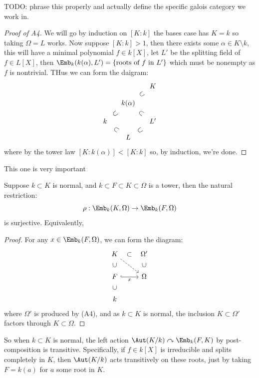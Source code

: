 \documentclass{article}
\begin{document}
TODO: phrase this properly and actually define the specific galois category we work in.

\begin{proof}[Proof of A4]
    We will go by induction on $[K:k]$ the bases case has $K=k$ so taking $\Omega = L$ works. Now suppose $[K:k]>1$, then there exists some $\alpha\in K\setminus k$, this will have a minimal polynomial $f\in k[X]$, let $L'$ be the splitting field of $f\in L[X]$, then $\Emb_k(k(\alpha),L') = \{\text{roots of $f$ in $L'$}\}$ which must be nonempty as $f$ is nontrivial. THus we can form the daigram:\[
    \begin{tikzcd}[row sep = small, column sep = small]
        & & K \\
        & k(\alpha) \arrow[ur, phantom, sloped, "\subset"] \arrow[dr, phantom, sloped, "\subset"]\\
        k \arrow[ur, phantom, sloped, "\subset"] \arrow[dr, phantom, sloped, "\subset"] && L'\\
        & L \arrow[ur, phantom, sloped, "\subset"]
    \end{tikzcd}
    \] where by the tower law $[K:k(\alpha)]<[K:k]$ so, by induction, we're done.
\end{proof}

This one is very important

\begin{lemma}
    Suppose $k\subset K$ is normal, and $k\subset F \subset K\subset \Omega$ is a tower, then the natural restriction: \[
    \rho : \Emb_k(K,\Omega)\rightarrow \Emb_k(F,\Omega)
    \] is surjective. Equivalently,
    \begin{proof}
        For any $x\in\Emb_k(F,\Omega)$, we can form the diagram: \[
        \begin{tikzcd}
            K \arrow[r, phantom, sloped, "\subset"] \arrow[rd, dashed] & \Omega'\\
            F \arrow[u, phantom, sloped, "\subset"] \arrow[r, hookrightarrow, "x", swap] & \Omega \arrow[u, phantom, sloped, "\subset"] \\
            k \arrow[u, phantom, sloped, "\subset"]
        \end{tikzcd} 
        \] where $\Omega'$ is produced by (A4), and as $k\subset K$ is normal, the inclusion $K\subset\Omega'$ factors through $K\subset\Omega$.
    \end{proof}
\end{lemma}

So when $k\subset K$ is normal, the left action $\Aut(K/k)\curvearrowright\Emb_k(F,K)$ by post-composition is transitive. Specifically, if $f\in k[X]$ is irreducible and splits completely in $K$, then $\Aut(K/k)$ acts transitively on these roots, just by taking $F=k(a)$ for $a$ some root in $K$.
\end{document}
